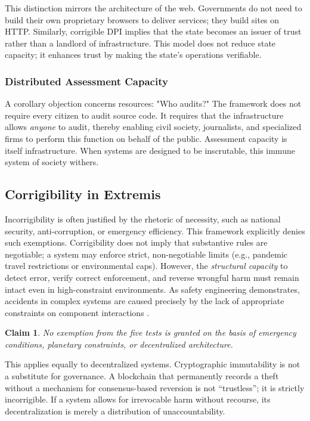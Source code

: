 \documentclass{article}
\newtheorem{claim}{Claim}
\begin{document}
This distinction mirrors the architecture of the web. Governments do not need to build their own proprietary browsers to deliver services; they build sites on HTTP. Similarly, corrigible DPI implies that the state becomes an issuer of trust rather than a landlord of infrastructure. This model does not reduce state capacity; it enhances trust by making the state's operations verifiable.

\subsubsection{Distributed Assessment Capacity}
A corollary objection concerns resources: "Who audits?" The framework does not require every citizen to audit source code. It requires that the infrastructure allows \textit{anyone} to audit, thereby enabling civil society, journalists, and specialized firms to perform this function on behalf of the public. Assessment capacity is itself infrastructure. When systems are designed to be inscrutable, this immune system of society withers.

\subsection{Corrigibility in Extremis}

Incorrigibility is often justified by the rhetoric of necessity, such as national security, anti-corruption, or emergency efficiency. This framework explicitly denies such exemptions. Corrigibility does not imply that substantive rules are negotiable; a system may enforce strict, non-negotiable limits (e.g., pandemic travel restrictions or environmental caps). However, the \textit{structural capacity} to detect error, verify correct enforcement, and reverse wrongful harm must remain intact even in high-constraint environments. As safety engineering demonstrates, accidents in complex systems are caused precisely by the lack of appropriate constraints on component interactions \citep{leveson2011}.

\begin{claim}
No exemption from the five tests is granted on the basis of emergency conditions, planetary constraints, or decentralized architecture.
\end{claim}

This applies equally to decentralized systems. Cryptographic immutability is not a substitute for governance. A blockchain that permanently records a theft without a mechanism for consensus-based reversion is not ``trustless''; it is strictly incorrigible. If a system allows for irrevocable harm without recourse, its decentralization is merely a distribution of unaccountability.
\end{document}
